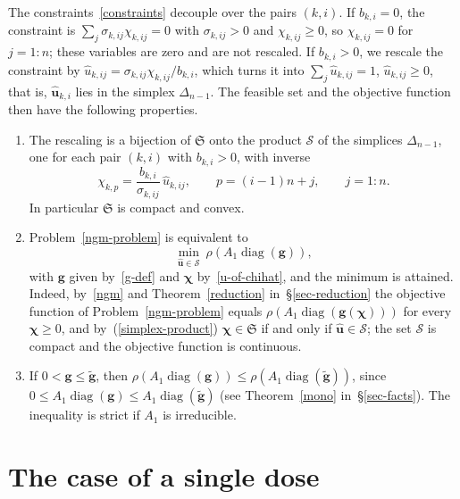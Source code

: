 \documentclass[11pt]{article}
\theoremstyle{plain}
\theoremstyle{definition}
\theoremstyle{remark}
\renewcommand{\labelenumi}{\textbf{\arabic{enumi}.}}
\numberwithin{equation}{section}
\numberwithin{figure}{section}
\numberwithin{table}{section}
\begin{document}
The constraints~\eqref{constraints} decouple over the pairs $(k,i)$. If
$b_{k,i}=0$, the constraint is $\sum_j\sigma_{k,ij}\chi_{k,ij}=0$ with
$\sigma_{k,ij}>0$ and $\chi_{k,ij}\ge 0$, so $\chi_{k,ij}=0$ for $j=1:n$; these
variables are zero and are not rescaled. If $b_{k,i}>0$, we rescale the
constraint by $\widehat u_{k,ij}=\sigma_{k,ij}\chi_{k,ij}/b_{k,i}$, which turns
it into $\sum_j\widehat u_{k,ij}=1$, $\widehat u_{k,ij}\ge 0$, that is,
$\widehat{\bm u}_{k,i}$ lies in the simplex $\Delta_{n-1}$. The feasible set and
the objective function then have the following properties.
\begin{enumerate}
\renewcommand{\theenumi}{\roman{enumi}}
\renewcommand{\labelenumi}{(\theenumi)}
\item\label{simplex-product} The rescaling is a bijection of $\mathfrak{S}$
onto the product $\mathcal{S}$ of the simplices $\Delta_{n-1}$, one for each pair
$(k,i)$ with $b_{k,i}>0$, with inverse
\begin{equation}\label{u-of-chihat}
\chi_{k,p}=\frac{b_{k,i}}{\sigma_{k,ij}}\,\widehat u_{k,ij},\qquad
p=(i-1)n+j,\qquad j=1:n .
\end{equation}
In particular $\mathfrak{S}$ is compact and convex.
\item\label{reduced-item} Problem~\ref{ngm-problem} is equivalent to
\begin{equation}\label{reduced-problem}
\min_{\widehat{\bm u}\in\mathcal{S}}\
\rho\left(A_1\operatorname{diag}\left(\bm g\right)\right),
\end{equation}
with $\bm g$ given by~\eqref{g-def} and $\bm\chi$ by~\eqref{u-of-chihat}, and the
minimum is attained. Indeed, by~\eqref{ngm} and Theorem~\ref{reduction}
in~\S\ref{sec-reduction} the
objective function of Problem~\ref{ngm-problem} equals
$\rho\left(A_1\operatorname{diag}(\bm g(\bm\chi))\right)$ for every $\bm\chi\ge 0$,
and by~(\ref{simplex-product}) $\bm\chi\in\mathfrak{S}$ if and only if
$\widehat{\bm u}\in\mathcal{S}$; the set $\mathcal{S}$ is compact and the
objective function is continuous.
\item\label{mono-g} If $0<\bm g\le\widetilde{\bm g}$, then
$\rho\left(A_1\operatorname{diag}(\bm g)\right)
\le\rho\left(A_1\operatorname{diag}(\widetilde{\bm g})\right)$,
since $0\le A_1\operatorname{diag}(\bm g)\le A_1\operatorname{diag}(\widetilde{\bm g})$
(see Theorem~\ref{mono} in~\S\ref{sec-facts}). The inequality is strict if
$A_1$ is irreducible.
\end{enumerate}

\section{The case of a single dose}\label{sec-single}
\end{document}
